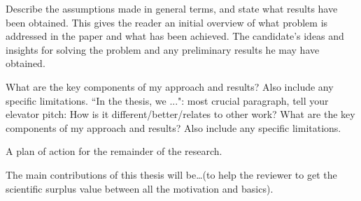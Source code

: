 Describe the assumptions made in general terms, and state what results have been obtained. This gives the reader an initial overview of what problem is addressed in the paper and what has been achieved.
The candidate's ideas and insights for solving the problem and any preliminary results he may have obtained.

What are the key components of my approach and results? Also include any specific limitations. ``In the thesis, we ...": most crucial paragraph, tell your elevator pitch: How is it different/better/relates to other work?
What are the key components of my approach and results? Also include any
specific limitations.


A plan of action for the remainder of the research.

The main contributions of this thesis will be\ldots (to help the reviewer to get the scientific surplus value between all the motivation and basics).

